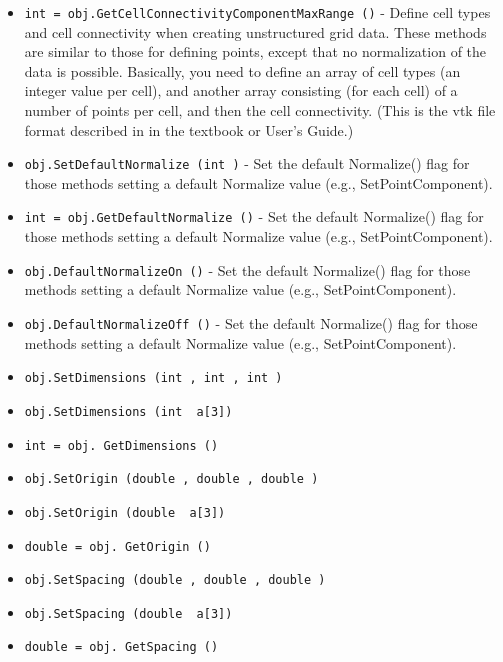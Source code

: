\begin{itemize}
\item  \verb|int = obj.GetCellConnectivityComponentMaxRange ()| -  Define cell types and cell connectivity when creating unstructured grid
 data.  These methods are similar to those for defining points, except
 that no normalization of the data is possible. Basically, you need to
 define an array of cell types (an integer value per cell), and another
 array consisting (for each cell) of a number of points per cell, and
 then the cell connectivity. (This is the vtk file format described in 
 in the textbook or User's Guide.)

\item  \verb|obj.SetDefaultNormalize (int )| -  Set the default Normalize() flag for those methods setting a default
 Normalize value (e.g., SetPointComponent).

\item  \verb|int = obj.GetDefaultNormalize ()| -  Set the default Normalize() flag for those methods setting a default
 Normalize value (e.g., SetPointComponent).

\item  \verb|obj.DefaultNormalizeOn ()| -  Set the default Normalize() flag for those methods setting a default
 Normalize value (e.g., SetPointComponent).

\item  \verb|obj.DefaultNormalizeOff ()| -  Set the default Normalize() flag for those methods setting a default
 Normalize value (e.g., SetPointComponent).

\item  \verb|obj.SetDimensions (int , int , int )|

\item  \verb|obj.SetDimensions (int  a[3])|

\item  \verb|int = obj. GetDimensions ()|

\item  \verb|obj.SetOrigin (double , double , double )|

\item  \verb|obj.SetOrigin (double  a[3])|

\item  \verb|double = obj. GetOrigin ()|

\item  \verb|obj.SetSpacing (double , double , double )|

\item  \verb|obj.SetSpacing (double  a[3])|

\item  \verb|double = obj. GetSpacing ()|


\end{itemize}
